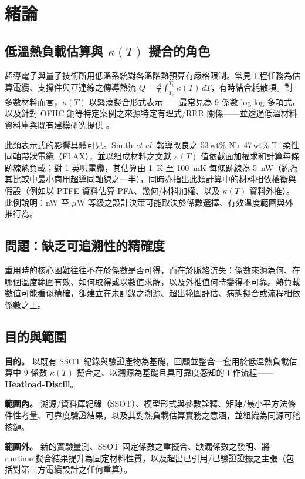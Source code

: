 \documentclass[11pt,a4paper]{article}
\begin{document}
\section{緒論}
\subsection{低溫熱負載估算與 $\kappa(T)$ 擬合的角色}
超導電子與量子技術所用低溫系統對各溫階熱預算有嚴格限制。常見工程任務為估算電纜、支撐件與互連線之傳導熱流 $Q=\frac{A}{L}\int_{T_c}^{T_h}\kappa(T)\,dT$，有時結合耗散項。對多數材料而言，$\kappa(T)$ 以緊湊擬合形式表示——最常見為 9 係數 log-log 多項式，以及針對 OFHC 銅等特定案例之來源特定有理式/RRR 關係——並透過低溫材料資料庫與既有建模研究提供 \cite{nist,marquardt,bradley,simon1992,flynn,raicu2025}。

此類表示式的影響具體可見。Smith \textit{et al.} 報導改良之 53\,wt\% Nb--47\,wt\% Ti 柔性同軸帶狀電纜（FLAX），並以組成材料之文獻 $\kappa(T)$ 值依截面加權求和計算每條跡線熱負載；對 1 英呎電纜，其估算由 1~K 至 100~mK 每條跡線為 5~nW（約為其比較中最小商用超導同軸線之一半），同時亦指出此類計算中的材料相依權衡與假設（例如以 PTFE 資料估算 PFA、幾何/材料加權、以及 $\kappa(T)$ 資料外推）\cite{smith2024}。此例說明：nW 至 $\mu$W 等級之設計決策可能取決於係數選擇、有效溫度範圍與外推行為。

\subsection{問題：缺乏可追溯性的精確度}
重用時的核心困難往往不在於係數是否可得，而在於脈絡流失：係數來源為何、在哪個溫度範圍有效、如何取得或以數值求解，以及外推值何時變得不可靠。熱負載數值可能看似精確，卻建立在未記錄之溯源、超出範圍評估、病態擬合或流程相依係數之上。

\subsection{目的與範圍}
\textbf{目的。} 以既有 SSOT 紀錄與驗證產物為基礎，回顧並整合一套用於低溫熱負載估算中 9 係數 $\kappa(T)$ 擬合之、以溯源為基礎且具可靠度感知的工作流程——\textbf{Heatload-Distill}。

\textbf{範圍內。} 溯源/資料庫紀錄（SSOT）、模型形式與參數詮釋、矩陣/最小平方法條件性考量、可靠度驗證結果，以及其對熱負載估算實務之意涵，並組織為同源可稽核鏈。

\textbf{範圍外。} 新的實驗量測、SSOT 固定係數之重擬合、缺漏係數之發明、將 runtime 擬合結果提升為固定材料性質，以及超出已引用/已驗證證據之主張（包括對第三方電纜設計之任何重算）。
\end{document}
